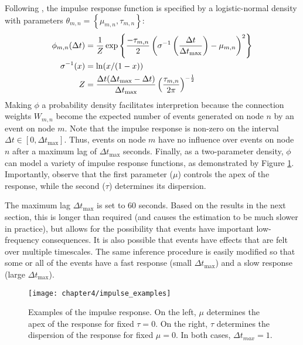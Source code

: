 		Following \cite{Linderman2015}, the impulse response function is specified by a logistic-normal density with parameters $\theta_{m , n} = \left \{ \mu_{m , n}, \tau_{m , n} \right \}$:
		\begin{align}
		\phi_{m, n}(\Delta t) &= \frac{1}{Z} \exp \left \{ \frac{-\tau_{m , n}}{2} \left( \sigma^{-1} \left( \frac{\Delta t}{\Delta t_{\text{max}}} \right) - \mu_{m , n} \right)^2  \right \} \notag \\
		\sigma^{-1}(x) &= \ln(x/(1-x)) \notag \\
		Z &= \frac{\Delta t (\Delta t_{\text{max}} - \Delta t)}{\Delta t_{\text{max}}} \left( \frac{\tau_{m , n}}{2 \pi} \right)^{-\frac{1}{2}}
		\end{align}
		Making $\phi$ a probability density facilitates interpretion because the connection weights $W_{m,n}$ become the expected number of events generated on node $n$ by an event on node $m$. Note that the impulse response is non-zero on the interval $\Delta t \in [0, \Delta t_{\text{max}}]$. Thus, events on node $m$ have no influence over events on node $n$ after a maximum lag of $\Delta t_{\text{max}}$ seconds. Finally, as a two-parameter density, $\phi$ can model a variety of impulse response functions, as demonstrated by Figure \ref{fig:impulse_examples}. Importantly, observe that the first parameter ($\mu$) controls the apex of the response, while the second ($\tau$) determines its dispersion.

		The maximum lag $\Delta t_{\text{max}}$ is set to 60 seconds. Based on the results in the next section, this is longer than required (and causes the estimation to be much slower in practice), but allows for the possibility that events have important low-frequency consequences. It is also possible that events have effects that are felt over multiple timescales. The same inference procedure is easily modified so that some or all of the events have a fast response (small $\Delta t_{\text{max}}$) and a slow response (large $\Delta t_{\text{max}}$).

		\begin{figure}[t]
			\small
			\linespread{1}
			\centering
			\texttt{[image: chapter4/impulse\_examples]}
			\captionsetup{skip=-20pt, labelsep=colon, font=footnotesize, width=\linewidth}
			\caption[Examples of the impulse response]{Examples of the impulse response. On the left, $\mu$ determines the apex of the response for fixed $\tau=0$. On the right, $\tau$ determines the dispersion of the response for fixed $\mu=0$. In both cases, $\Delta t_{max} = 1$.}
			\label{fig:impulse_examples}
		\end{figure}

